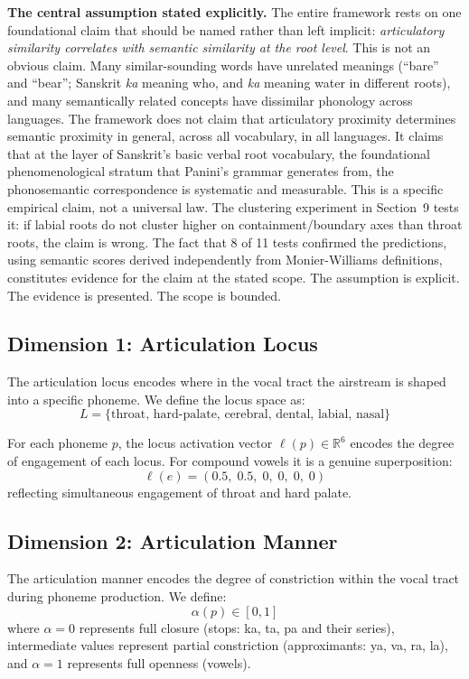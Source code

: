 \documentclass[12pt]{article}
\begin{document}
\textbf{The central assumption stated explicitly.} The entire framework rests on one foundational claim that should be named rather than left implicit: \textit{articulatory similarity correlates with semantic similarity at the root level}. This is not an obvious claim. Many similar-sounding words have unrelated meanings (``bare'' and ``bear''; Sanskrit \textit{ka} meaning who, and \textit{ka} meaning water in different roots), and many semantically related concepts have dissimilar phonology across languages. The framework does not claim that articulatory proximity determines semantic proximity in general, across all vocabulary, in all languages. It claims that at the layer of Sanskrit's basic verbal root vocabulary, the foundational phenomenological stratum that Panini's grammar generates from, the phonosemantic correspondence is systematic and measurable. This is a specific empirical claim, not a universal law. The clustering experiment in Section~9 tests it: if labial roots do not cluster higher on containment/boundary axes than throat roots, the claim is wrong. The fact that 8 of 11 tests confirmed the predictions, using semantic scores derived independently from Monier-Williams definitions, constitutes evidence for the claim at the stated scope. The assumption is explicit. The evidence is presented. The scope is bounded.

\subsection{Dimension 1: Articulation Locus}

The articulation locus encodes where in the vocal tract the airstream is shaped into a specific phoneme. We define the locus space as:
\[
L = \{\text{throat, hard-palate, cerebral, dental, labial, nasal}\}
\]

For each phoneme $p$, the locus activation vector $\ell(p) \in \mathbb{R}^6$ encodes the degree of engagement of each locus. For compound vowels it is a genuine superposition:
\[
\ell(e) = (0.5,\; 0.5,\; 0,\; 0,\; 0,\; 0)
\]
reflecting simultaneous engagement of throat and hard palate.

\subsection{Dimension 2: Articulation Manner}

The articulation manner encodes the degree of constriction within the vocal tract during phoneme production. We define:
\[
\alpha(p) \in [0,1]
\]
where $\alpha = 0$ represents full closure (stops: ka, ta, pa and their series), intermediate values represent partial constriction (approximants: ya, va, ra, la), and $\alpha = 1$ represents full openness (vowels).
\end{document}

